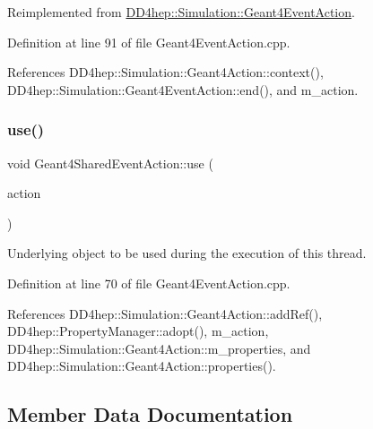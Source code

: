 Reimplemented from \hyperlink{class_d_d4hep_1_1_simulation_1_1_geant4_event_action_af131bad73c28da3419af7c29e0b8c250}{D\+D4hep\+::\+Simulation\+::\+Geant4\+Event\+Action}.



Definition at line 91 of file Geant4\+Event\+Action.\+cpp.



References D\+D4hep\+::\+Simulation\+::\+Geant4\+Action\+::context(), D\+D4hep\+::\+Simulation\+::\+Geant4\+Event\+Action\+::end(), and m\+\_\+action.

\hypertarget{class_d_d4hep_1_1_simulation_1_1_geant4_shared_event_action_a1b553e6983d3ce8bb3a84f660216175b}{}\label{class_d_d4hep_1_1_simulation_1_1_geant4_shared_event_action_a1b553e6983d3ce8bb3a84f660216175b} 
\subsubsection{\texorpdfstring{use()}{use()}}
{\footnotesize\ttfamily void Geant4\+Shared\+Event\+Action\+::use (\begin{DoxyParamCaption}\item[{\hyperlink{class_d_d4hep_1_1_simulation_1_1_geant4_event_action}{Geant4\+Event\+Action} $\ast$}]{action }\end{DoxyParamCaption})\hspace{0.3cm}{\ttfamily [virtual]}}



Underlying object to be used during the execution of this thread. 



Definition at line 70 of file Geant4\+Event\+Action.\+cpp.



References D\+D4hep\+::\+Simulation\+::\+Geant4\+Action\+::add\+Ref(), D\+D4hep\+::\+Property\+Manager\+::adopt(), m\+\_\+action, D\+D4hep\+::\+Simulation\+::\+Geant4\+Action\+::m\+\_\+properties, and D\+D4hep\+::\+Simulation\+::\+Geant4\+Action\+::properties().



\subsection{Member Data Documentation}
\hypertarget{class_d_d4hep_1_1_simulation_1_1_geant4_shared_event_action_aa79a57a0581a48e4f211acec481ada26}{}\label{class_d_d4hep_1_1_simulation_1_1_geant4_shared_event_action_aa79a57a0581a48e4f211acec481ada26} 
